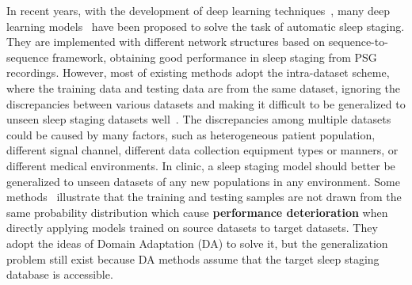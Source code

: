 \documentclass[letterpaper]{article} %
\begin{document}
	 In recent years, with the development of deep learning techniques~\citep{sun2016remembered, pan2018rapid, yi2021hippocampal, Wang2023ARO}, many deep learning models~\citep{phan2022automatic} have been proposed to solve the task of automatic sleep staging.
	They are implemented with different network structures based on sequence-to-sequence framework, obtaining good performance in sleep staging from PSG recordings.
	However, most of existing methods adopt the intra-dataset scheme, where the training data and testing data are from the same dataset, ignoring the discrepancies between various datasets and making it difficult to be generalized to unseen sleep staging datasets well~\citep{anido2022analysis}.
	The discrepancies among multiple datasets could be caused by many factors, such as heterogeneous patient population,  different signal channel, different data collection equipment types or manners, or different medical environments.
	In clinic, a sleep staging model should better be generalized to unseen datasets of any new populations in any environment.
	Some methods~\citep{yoo2021transferring, fan2022unsupervised, wang2022automatic} illustrate that the training and testing samples are not drawn from the same probability distribution which cause \textbf{performance deterioration} when directly applying models trained on source datasets to target datasets. They adopt the ideas of Domain Adaptation (DA) to solve it, but the generalization problem still exist because DA methods assume that the target sleep staging database is accessible.

\end{document}
